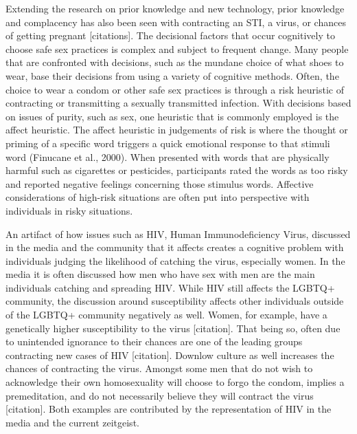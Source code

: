 \documentclass[
  donotrepeattitle,doc, 12pt, a4paper,floatsintext]{apa7}
\begin{document}
Extending the research on prior knowledge and new technology, prior knowledge and complacency has also been seen with contracting an STI, a virus, or chances of getting pregnant {[}citations{]}. The decisional factors that occur cognitively to choose safe sex practices is complex and subject to frequent change. Many people that are confronted with decisions, such as the mundane choice of what shoes to wear, base their decisions from using a variety of cognitive methods. Often, the choice to wear a condom or other safe sex practices is through a risk heuristic of contracting or transmitting a sexually transmitted infection. With decisions based on issues of purity, such as sex, one heuristic that is commonly employed is the affect heuristic. The affect heuristic in judgements of risk is where the thought or priming of a specific word triggers a quick emotional response to that stimuli word (Finucane et al., 2000). When presented with words that are physically harmful such as cigarettes or pesticides, participants rated the words as too risky and reported negative feelings concerning those stimulus words. Affective considerations of high-risk situations are often put into perspective with individuals in risky situations.

An artifact of how issues such as HIV, Human Immunodeficiency Virus, discussed in the media and the community that it affects creates a cognitive problem with individuals judging the likelihood of catching the virus, especially women. In the media it is often discussed how men who have sex with men are the main individuals catching and spreading HIV. While HIV still affects the LGBTQ+ community, the discussion around susceptibility affects other individuals outside of the LGBTQ+ community negatively as well. Women, for example, have a genetically higher susceptibility to the virus {[}citation{]}. That being so, often due to unintended ignorance to their chances are one of the leading groups contracting new cases of HIV {[}citation{]}. Downlow culture as well increases the chances of contracting the virus. Amongst some men that do not wish to acknowledge their own homosexuality will choose to forgo the condom, implies a premeditation, and do not necessarily believe they will contract the virus {[}citation{]}. Both examples are contributed by the representation of HIV in the media and the current zeitgeist.
\end{document}
